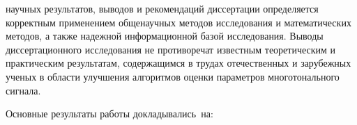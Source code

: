 {\reliability} 
научных результатов, выводов и рекомендаций диссертации определяется корректным применением
общенаучных методов исследования и математических методов, а также
надежной информационной базой исследования. Выводы диссертационного исследования не противоречат известным теоретическим и практическим результатам, содержащимся в трудах отечественных и зарубежных ученых в области улучшения алгоритмов оценки параметров многотонального сигнала.



{\probation}
Основные результаты работы докладывались~на:

